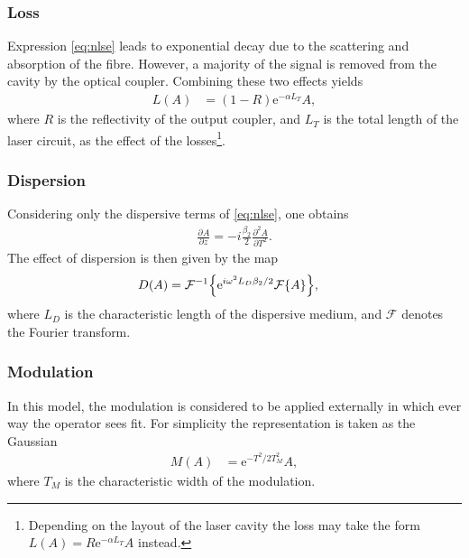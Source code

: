 \documentclass[graybox]{svmult}
\let\originalleft\left
\let\originalright\right
\renewcommand{\left}{\mathopen{}\mathclose\bgroup\originalleft}
\renewcommand{\right}{\aftergroup\egroup\originalright}
\newcommand{\pdiff}[3][]{\frac{\partial^{#1}#2}{\partial{#3}^{#1}}}
\newcommand{\FT}[1]{\mathcal{F}\left\{ #1 \right\}}
\newcommand{\FTi}[1]{\mathcal{F}^{-1}\left\{ #1 \right\}}
\begin{document}
\subsubsection{Loss}
Expression \eqref{eq:nlse} leads to exponential decay due to the scattering and absorption of the fibre. However, a majority of the signal is removed from the cavity by the optical coupler. Combining these two effects yields
\begin{align}
	L(A) &= (1 - R) \textrm{e}^{- \alpha L_T}A,
\end{align}
where $R$ is the reflectivity of the output coupler, and $L_T$ is the total length of the laser circuit, as the effect of the losses\footnote{Depending on the layout of the laser cavity the loss may take the form $L(A) = R \textrm{e}^{- \alpha L_T}A$ instead.}.

\subsubsection{Dispersion}
Considering only the dispersive terms of \eqref{eq:nlse}, one obtains
\begin{align}
	\label{eq:dispde}
	\pdiff{A}{z} = -i \frac{\beta_2}{2} \pdiff[2]{A}{T}.
\end{align}
The effect of dispersion is then given by the map
\begin{align}
D(A) &= \FTi{\textrm{e}^{i \omega^2 L_D\beta_2/2} \FT{A}},
\end{align}
where $L_D$ is the characteristic length of the dispersive medium, and $\mathcal{F}$ denotes the Fourier transform.

\subsubsection{Modulation}
In this model, the modulation is considered to be applied externally in which ever way the operator sees fit. For simplicity the representation is taken as the Gaussian
\begin{align}
	M(A) &= \textrm{e}^{-T^2 / 2 T_M^2} A,
\end{align}
where $T_M$ is the characteristic width of the modulation.
\end{document}
